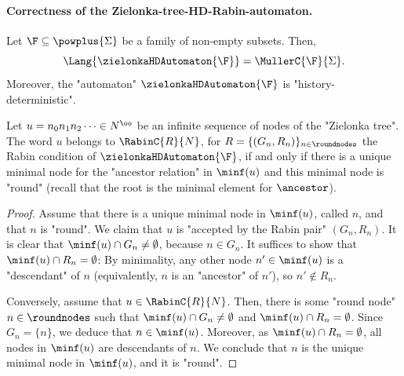 \documentclass[10pt,a4paper]{amsart}
\renewcommand{\SS}{\Sigma}
\begin{document}
\paragraph*{Correctness of the Zielonka-tree-HD-Rabin-automaton.}

\begin{proposition}[Correctness]\label{prop-ZT:correctness_ZT_HD-Rabin}
	Let $\F\subseteq \powplus{\SS}$ be a family of non-empty subsets. Then, 
	\[ \Lang{\zielonkaHDAutomaton{\F}} = \MullerC{\F}{\SS}. \]
	Moreover, the "automaton" $\zielonkaHDAutomaton{\F}$ is "history-deterministic".
\end{proposition}


\begin{lemma}\label{lemma-ZT:Rabin-acc-sequences-nodes-ZT}
	Let $u = n_0n_1n_2\dots \in N^\oo$ be an infinite sequence of nodes of the "Zielonka tree". The word $u$ belongs to $\RabinC{R}{N}$, for $R = \{(G_n,R_n)\}_{n\in\roundnodes}$ the Rabin condition of $\zielonkaHDAutomaton{\F}$, if and only if there is a unique minimal node for the "ancestor relation" in $\minf(u)$ and this minimal node is "round" (recall that the root is the minimal element for $\ancestor$).
\end{lemma}
\begin{proof}
	Assume that there is a unique minimal node in $\minf(u)$, called $n$, and that $n$ is "round". We claim that $u$ is "accepted by the Rabin pair" $(G_n,R_n)$. It is clear that $\minf(u)\cap G_n\neq \emptyset$, because $n\in G_n$. It suffices to show that $\minf(u)\cap R_n = \emptyset$: By minimality, any other node $n'\in \minf(u)$ is a "descendant" of $n$ (equivalently, $n$ is an "ancestor" of $n'$), so $n'\notin R_n$.
	
	Conversely, assume that $u\in \RabinC{R}{N}$. Then, there is some "round node" $n\in \roundnodes$ such that $\minf(u)\cap G_n \neq \emptyset$ and $\minf(u)\cap R_n = \emptyset$. Since $G_n = \{n\}$, we deduce that $n\in \minf(u)$. Moreover, as $\minf(u)\cap R_n = \emptyset$, all nodes in $\minf(u)$ are descendants of $n$. We conclude that $n$ is the unique minimal node in $\minf(u)$, and it is "round".
\end{proof}
\end{document}
